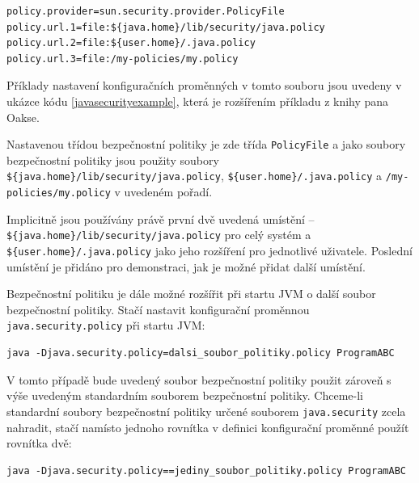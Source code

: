 \begin{lstlisting}[caption=Význačnější proměnné konfiguračního souboru {\tt java.security}, label=javasecurityexample]
policy.provider=sun.security.provider.PolicyFile
policy.url.1=file:${java.home}/lib/security/java.policy
policy.url.2=file:${user.home}/.java.policy
policy.url.3=file:/my-policies/my.policy
\end{lstlisting}

Příklady nastavení konfiguračních proměnných v tomto souboru jsou uvedeny v ukázce kódu \ref{javasecurityexample}, která je rozšířením příkladu z knihy pana Oakse. \cite[5.3.1]{oaks}

Nastavenou třídou bezpečnostní politiky je zde třída {\tt PolicyFile} a jako soubory bezpečnostní politiky jsou použity
soubory {\tt \$\{java.home\}/lib/security/java.policy}, {\tt \$\{user{\linebreak}.home\}/.java.policy} a {\tt /my-policies/my.policy} v uvedeném pořadí.

Implicitně jsou používány právě první dvě uvedená umístění -- {\tt \$\{java.home\}/lib/secu{\linebreak}rity/java.policy} pro celý systém a {\tt \$\{user.home\}/.java.policy} jako jeho rozšíření pro jednotlivé uživatele. Poslední umístění je přidáno pro demonstraci, jak je možné přidat další umístění. \cite{refSecurity}

Bezpečnostní politiku je dále možné rozšířit při startu JVM o další soubor bezpečnostní politiky. Stačí nastavit konfigurační proměnnou {\tt java.security.policy} při startu JVM: \cite[5.3.1]{oaks}

\begin{lstlisting}[caption=Spuštění JVM s vlastním souborem bezpečnostní politiky, label=nastaveniBP]
java -Djava.security.policy=dalsi_soubor_politiky.policy ProgramABC
\end{lstlisting}

V tomto případě bude uvedený soubor bezpečnostní politiky použit zároveň s výše uvedeným standardním souborem bezpečnostní politiky. Chceme-li standardní soubory bezpečnostní politiky určené souborem {\tt java.security} zcela nahradit, stačí namísto jednoho rovnítka v definici konfigurační proměnné použít rovnítka dvě: \cite[5.3.1]{oaks}

\begin{lstlisting}[caption=Spuštění JVM jen s vlastním souborem bezpečnostní politiky, label=nastaveniBP2]
java -Djava.security.policy==jediny_soubor_politiky.policy ProgramABC
\end{lstlisting}

